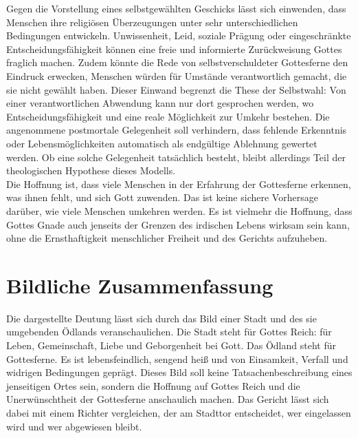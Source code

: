 Gegen die Vorstellung eines selbstgewählten Geschicks lässt sich einwenden, dass Menschen ihre religiösen Überzeugungen unter sehr unterschiedlichen Bedingungen entwickeln. Unwissenheit, Leid, soziale Prägung oder eingeschränkte Entscheidungsfähigkeit können eine freie und informierte Zurückweisung Gottes fraglich machen. Zudem könnte die Rede von selbstverschuldeter Gottesferne den Eindruck erwecken, Menschen würden für Umstände verantwortlich gemacht, die sie nicht gewählt haben. Dieser Einwand begrenzt die These der Selbstwahl: Von einer verantwortlichen Abwendung kann nur dort gesprochen werden, wo Entscheidungsfähigkeit und eine reale Möglichkeit zur Umkehr bestehen. Die angenommene postmortale Gelegenheit soll verhindern, dass fehlende Erkenntnis oder Lebensmöglichkeiten automatisch als endgültige Ablehnung gewertet werden. Ob eine solche Gelegenheit tatsächlich besteht, bleibt allerdings Teil der theologischen Hypothese dieses Modells.
\\

Die Hoffnung ist, dass viele Menschen in der Erfahrung der Gottesferne erkennen, was ihnen fehlt, und sich Gott zuwenden. Das ist keine sichere Vorhersage darüber, wie viele Menschen umkehren werden. Es ist vielmehr die Hoffnung, dass Gottes Gnade auch jenseits der Grenzen des irdischen Lebens wirksam sein kann, ohne die Ernsthaftigkeit menschlicher Freiheit und des Gerichts aufzuheben.

\section{Bildliche Zusammenfassung}

Die dargestellte Deutung lässt sich durch das Bild einer Stadt und des sie umgebenden Ödlands veranschaulichen. Die Stadt steht für Gottes Reich: für Leben, Gemeinschaft, Liebe und Geborgenheit bei Gott. Das Ödland steht für Gottesferne. Es ist lebensfeindlich, sengend heiß und von Einsamkeit, Verfall und widrigen Bedingungen geprägt. Dieses Bild soll keine Tatsachenbeschreibung eines jenseitigen Ortes sein, sondern die Hoffnung auf Gottes Reich und die Unerwünschtheit der Gottesferne anschaulich machen. Das Gericht lässt sich dabei mit einem Richter vergleichen, der am Stadttor entscheidet, wer eingelassen wird und wer abgewiesen bleibt.
\\

